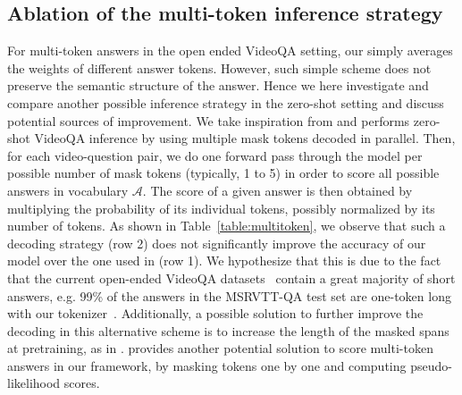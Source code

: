 \subsection{Ablation of the multi-token inference strategy}\label{sec:multitoken}
For multi-token answers in the open ended VideoQA setting, our \model{} simply averages the weights of different answer tokens.
However, such simple scheme does not preserve the semantic structure of the answer.
Hence we here investigate and compare another possible inference strategy in the zero-shot setting and discuss potential sources of improvement.
We take inspiration from \cite{jiang2020x} and performs zero-shot VideoQA inference by using multiple mask tokens decoded in parallel. 
Then, for each video-question pair, we do one forward pass through the model per possible number of mask tokens (typically, 1 to 5) in order to score all possible answers in vocabulary $\mathcal{A}$. 
The score of a given answer is then obtained by multiplying the probability of its individual tokens, possibly normalized by its number of tokens. 
As shown in Table~\ref{table:multitoken}, we observe that such a decoding strategy (row 2) does not significantly improve the accuracy of our model over the one used in \model{} (row 1). 
We hypothesize that this is due to the fact that the current open-ended VideoQA datasets~\cite{jang2017tgif, xu2017video, yang2021just, yu2019activitynet} contain a great majority of short answers, e.g. 99\% of the answers in the MSRVTT-QA test set are one-token long with our tokenizer~\cite{kudo2018sentencepiece}. 
Additionally, a possible solution to further improve the decoding in this alternative scheme is to increase the length of the masked spans at pretraining, as in \cite{joshi2020spanbert}. 
\cite{salazar2019masked} provides another potential solution to score multi-token answers in our framework, by masking tokens one by one and computing pseudo-likelihood scores.

